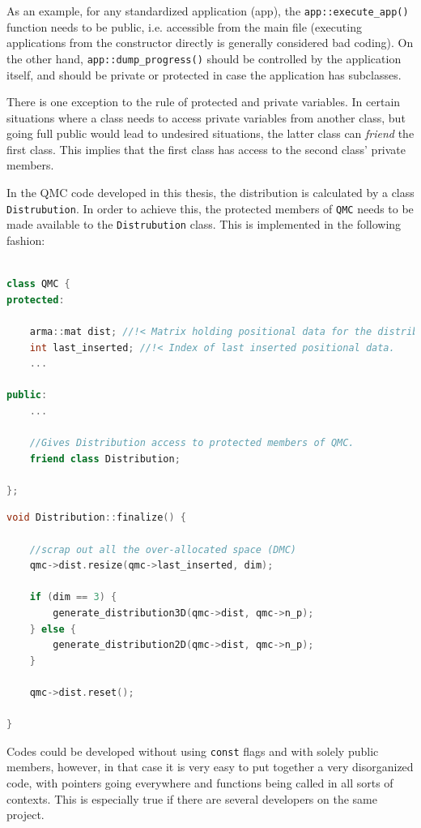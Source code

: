 As an example, for any standardized application (app), the \verb+app::execute_app()+ function needs to be public, i.e. accessible from the main file (executing applications from the constructor directly is generally considered bad coding). On the other hand, \verb+app::dump_progress()+ should be controlled by the application itself, and should be private or protected in case the application has subclasses.

There is one exception to the rule of protected and private variables. In certain situations where a class needs to access private variables from another class, but going full public would lead to undesired situations, the latter class can \textit{friend} the first class. This implies that the first class has access to the second class' private members.

In the QMC code developed in this thesis, the distribution is calculated by a class \verb+Distrubution+. In order to achieve this, the protected members of \verb+QMC+ needs to be made available to the \verb+Distrubution+ class. This is implemented in the following fashion:

\clearpage
\begin{lstlisting}[language=c++]

class QMC {
protected:
    
    arma::mat dist; //!< Matrix holding positional data for the distribution.
    int last_inserted; //!< Index of last inserted positional data.
    ...

public:
    ...

    //Gives Distribution access to protected members of QMC.
    friend class Distribution;

};
\end{lstlisting}

\begin{lstlisting}[language=c++]
void Distribution::finalize() {

    //scrap out all the over-allocated space (DMC)
    qmc->dist.resize(qmc->last_inserted, dim);

    if (dim == 3) {
        generate_distribution3D(qmc->dist, qmc->n_p);
    } else {
        generate_distribution2D(qmc->dist, qmc->n_p);
    }

    qmc->dist.reset();

}
\end{lstlisting}

Codes could be developed without using \verb+const+ flags and with solely public members, however, in that case it is very easy to put together a very disorganized code, with pointers going everywhere and functions being called in all sorts of contexts. This is especially true if there are several developers on the same project. 

